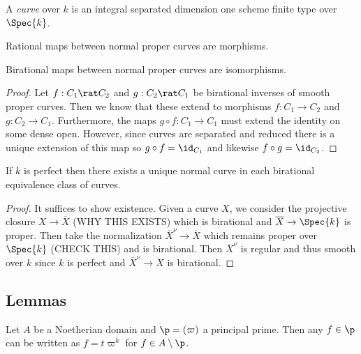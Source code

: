 \documentclass[12pt]{article}
\begin{document}
\begin{defn}
A \textit{curve} over $k$ is an integral separated dimension one scheme finite type over $\Spec{k}$.
\end{defn}

\begin{cor}
Rational maps between normal proper curves are morphisms.
\end{cor}

\begin{cor}
Birational maps between normal proper curves are isomorphisms.
\end{cor}

\begin{proof}
Let $f : C_1 \rat C_2$ and $g : C_2 \rat C_1$ be birational inverses of smooth proper curves. Then we know that these extend to morphisms $f : C_1 \to C_2$ and $g : C_2 \to C_1$. Furthermore, the maps $g \circ f : C_1 \to C_1$ must extend the identity on some dense open. However, since curves are separated and reduced there is a unique extension of this map so $g \circ f = \id_{C_1}$ and likewise $f \circ g = \id_{C_2}$. 
\end{proof}

\begin{thm}
If $k$ is perfect then there exists a unique normal curve in each birational equivalence class of curves.
\end{thm}

\begin{proof}
It suffices to show existence. Given a curve $X$, we consider the projective closure $X \to \overline{X}$ (WHY THIS EXISTS) which is birational and $\overline{X} \to \Spec{k}$ is proper. Then take the normalization $\overline{X}^\nu \to \overline{X}$ which remains proper over $\Spec{k}$ (CHECK THIS) and is birational. Then $\overline{X}^\nu$ is regular and thus smooth over $k$ since $k$ is perfect and $\overline{X}^\nu \to X$ is birational.
\end{proof}

\subsection{Lemmas}

\begin{lemma} \label{principal_ideal_powers}
Let $A$ be a Noetherian domain and $\p = (\varpi)$ a principal prime. Then any $f \in \p$ can be written as $f = t \varpi^k$ for $f \in A \setminus \p$. 
\end{lemma}
\end{document}
